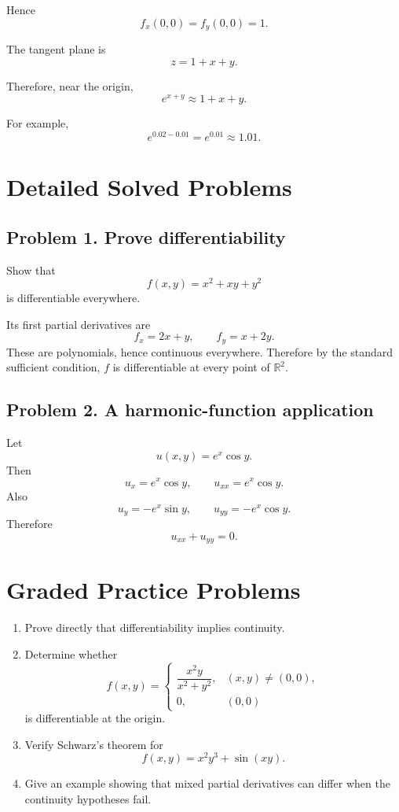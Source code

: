 \documentclass[11pt,oneside]{book}
\theoremstyle{studentthm}
\theoremstyle{definition}
\newcommand{\R}{\mathbb{R}}
\begin{document}
Hence
\[
f_x(0,0)=f_y(0,0)=1.
\]

The tangent plane is
\[
z=1+x+y.
\]

Therefore, near the origin,
\[
e^{x+y}\approx1+x+y.
\]

For example,
\[
e^{0.02-0.01}
=
e^{0.01}
\approx
1.01.
\]


\section{Detailed Solved Problems}

\subsection*{Problem 1. Prove differentiability}
Show that
\[
f(x,y)=x^2+xy+y^2
\]
is differentiable everywhere.

Its first partial derivatives are
\[
f_x=2x+y,
\qquad
f_y=x+2y.
\]
These are polynomials, hence continuous everywhere. Therefore by the
standard sufficient condition, \(f\) is differentiable at every
point of \(\R^2\).

\subsection*{Problem 2. A harmonic-function application}
Let
\[
u(x,y)=e^x\cos y.
\]
Then
\[
u_x=e^x\cos y,
\qquad
u_{xx}=e^x\cos y.
\]
Also
\[
u_y=-e^x\sin y,
\qquad
u_{yy}=-e^x\cos y.
\]
Therefore
\[
u_{xx}+u_{yy}=0.
\]

\section{Graded Practice Problems}
\begin{enumerate}
\item Prove directly that differentiability implies continuity.
\item Determine whether
\[
f(x,y)=
\begin{cases}
\dfrac{x^2y}{x^2+y^2},&(x,y)\ne(0,0),\\
0,&(0,0)
\end{cases}
\]
is differentiable at the origin.
\item Verify Schwarz's theorem for
\[
f(x,y)=x^2y^3+\sin(xy).
\]
\item Give an example showing that mixed partial derivatives can
differ when the continuity hypotheses fail.
\end{enumerate}

\end{document}
